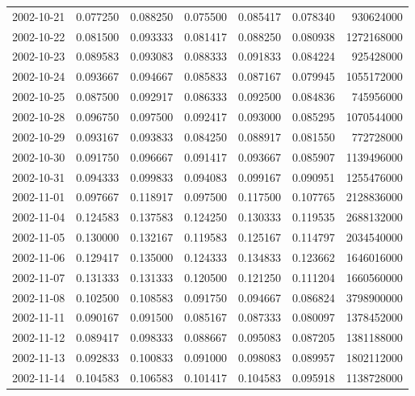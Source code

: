 \begin{tabular}{lrrrrrr}
2002-10-21 &    0.077250 &    0.088250 &    0.075500 &    0.085417 &    0.078340 &   930624000 \\
2002-10-22 &    0.081500 &    0.093333 &    0.081417 &    0.088250 &    0.080938 &  1272168000 \\
2002-10-23 &    0.089583 &    0.093083 &    0.088333 &    0.091833 &    0.084224 &   925428000 \\
2002-10-24 &    0.093667 &    0.094667 &    0.085833 &    0.087167 &    0.079945 &  1055172000 \\
2002-10-25 &    0.087500 &    0.092917 &    0.086333 &    0.092500 &    0.084836 &   745956000 \\
2002-10-28 &    0.096750 &    0.097500 &    0.092417 &    0.093000 &    0.085295 &  1070544000 \\
2002-10-29 &    0.093167 &    0.093833 &    0.084250 &    0.088917 &    0.081550 &   772728000 \\
2002-10-30 &    0.091750 &    0.096667 &    0.091417 &    0.093667 &    0.085907 &  1139496000 \\
2002-10-31 &    0.094333 &    0.099833 &    0.094083 &    0.099167 &    0.090951 &  1255476000 \\
2002-11-01 &    0.097667 &    0.118917 &    0.097500 &    0.117500 &    0.107765 &  2128836000 \\
2002-11-04 &    0.124583 &    0.137583 &    0.124250 &    0.130333 &    0.119535 &  2688132000 \\
2002-11-05 &    0.130000 &    0.132167 &    0.119583 &    0.125167 &    0.114797 &  2034540000 \\
2002-11-06 &    0.129417 &    0.135000 &    0.124333 &    0.134833 &    0.123662 &  1646016000 \\
2002-11-07 &    0.131333 &    0.131333 &    0.120500 &    0.121250 &    0.111204 &  1660560000 \\
2002-11-08 &    0.102500 &    0.108583 &    0.091750 &    0.094667 &    0.086824 &  3798900000 \\
2002-11-11 &    0.090167 &    0.091500 &    0.085167 &    0.087333 &    0.080097 &  1378452000 \\
2002-11-12 &    0.089417 &    0.098333 &    0.088667 &    0.095083 &    0.087205 &  1381188000 \\
2002-11-13 &    0.092833 &    0.100833 &    0.091000 &    0.098083 &    0.089957 &  1802112000 \\
2002-11-14 &    0.104583 &    0.106583 &    0.101417 &    0.104583 &    0.095918 &  1138728000 \\

\end{tabular}
